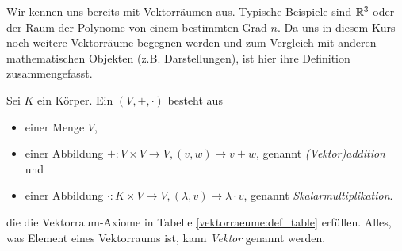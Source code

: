 Wir kennen uns bereits mit Vektorräumen aus. Typische Beispiele sind $\mathbb{R}^3$ oder der Raum der Polynome von einem bestimmten Grad $n$. Da uns in diesem Kurs noch weitere Vektorräume begegnen werden und zum Vergleich mit anderen mathematischen Objekten (z.B. Darstellungen), ist hier ihre Definition zusammengefasst.


\begin{definition}\label{vektorraeume:def}
Sei $K$ ein Körper. Ein  $(V,+,\cdot)$ besteht aus
\begin{itemize}
	\item einer Menge $V$,
	\item einer Abbildung $+: V \times V \to V, (v,w) \mapsto v+w$, genannt \emph{(Vektor)addition} und
	\item einer Abbildung $\cdot: K \times V \to V, (\lambda,v) \mapsto \lambda\cdot v$, genannt \emph{Skalarmultiplikation}.
\end{itemize}
die die Vektorraum-Axiome in Tabelle \ref{vektorraeume:def_table} erfüllen. Alles, was Element eines Vektorraums ist, kann \emph{Vektor} genannt werden.

\begin{table}[!ht]
	\setlength\extrarowheight{10pt} %
	\begin{tabularx}{\textwidth}{p{7cm} X}
		

\end{tabularx}
\end{table}
\end{definition}

